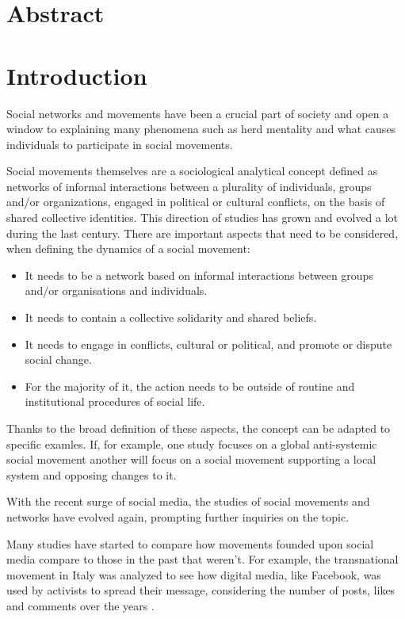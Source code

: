 \documentclass{article}
\begin{document}
    \section{Abstract}
    \section{Introduction}
    Social networks and movements have been a crucial part of society and open a window to explaining many phenomena such as herd mentality and what causes individuals to participate in social movements\cite{diani_networks_2013}.
    
    Social movements themselves are a sociological analytical concept defined as networks of informal interactions between a plurality of individuals, groups and/or organizations, engaged in political or cultural conflicts, on the basis of shared collective identities. This direction of studies has grown and evolved a lot during the last century. There are important aspects that need to be considered, when defining the dynamics of a social movement: 
    \begin{itemize}
    \item It needs to be a network based on informal interactions between groups and/or organisations and individuals.
    \item It needs to contain a collective solidarity and shared beliefs.
    \item It needs to engage in conflicts, cultural or political, and promote or dispute social change.
    \item  For the majority of it, the action needs to be outside of routine and institutional procedures of social life.
    \end{itemize}
    Thanks to the broad definition of these aspects, the concept can be adapted to specific examles. If, for example, one study focuses on a global anti-systemic social movement another will focus on a social movement supporting a local system and opposing changes to it\cite{diani_concept_1992}.
    
    With the recent surge of social media, the studies of social movements and networks have evolved again, prompting further inquiries on the topic\cite{kumar_structure_2006}.
    
    Many studies have started to compare how movements founded upon social media compare to those in the past that weren't\cite{kidd_social_2016}. For example, the transnational movement in Italy was analyzed to see how digital media, like Facebook, was used by activists to spread their message, considering the number of posts, likes and comments over the  years \cite{pavan_digital_2019}. 
    
\end{document}
